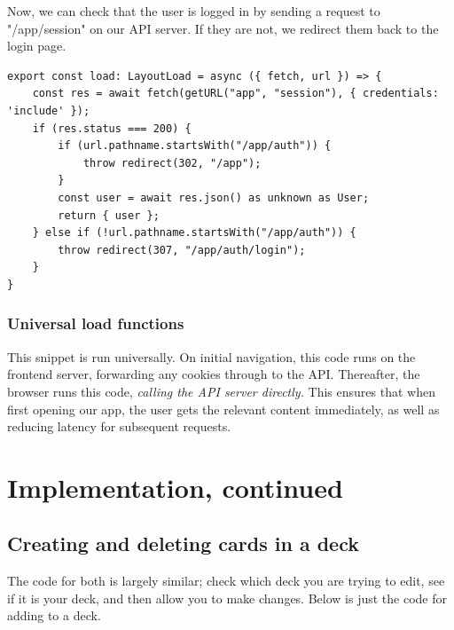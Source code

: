 \documentclass{report}
\begin{document}
Now, we can check that the user is logged in by sending a request to "/app/session" on our API server. If they are not, we redirect them back to the login page.

\begin{verbatim}
export const load: LayoutLoad = async ({ fetch, url }) => {
	const res = await fetch(getURL("app", "session"), { credentials: 'include' });
	if (res.status === 200) {
		if (url.pathname.startsWith("/app/auth")) {
			throw redirect(302, "/app");
		}
		const user = await res.json() as unknown as User;
		return { user };
	} else if (!url.pathname.startsWith("/app/auth")) {
		throw redirect(307, "/app/auth/login");
	}
}
\end{verbatim}

\subsection{Universal load functions}
This snippet is run universally. On initial navigation, this code runs on the frontend server, forwarding any cookies through to the API. Thereafter, the browser runs this code, \emph{calling the API server directly.} This ensures that when first opening our app, the user gets the relevant content immediately, as well as reducing latency for subsequent requests.

\chapter{Implementation, continued}
\section{Creating and deleting cards in a deck}

The code for both is largely similar; check which deck you are trying to edit, see if it is your deck, and then allow you to make changes. Below is just the code for adding to a deck.
\end{document}
